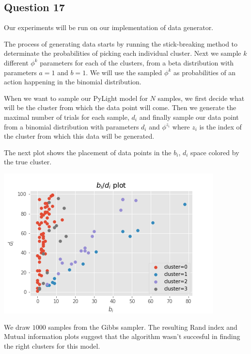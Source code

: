 \documentclass[]{article}
\begin{document}
	
	
	\subsection*{Question 17}
	
	Our experiments will be run on our implementation of data generator. 
	
	The process of generating data starts by running the stick-breaking method to determinate the probabilities of picking each individual cluster. Next we sample $k$ different $\phi^k$ parameters for each of the clusters, from a beta distribution with parameters $a=1$ and $b=1$.
	We will use the sampled $\phi^k$ as probabilities of an action happening in the binomial distribution.
	
	When we want to sample our PyLight model for $N$ samples, we first decide what will be the cluster from which the data point will come. Then we generate the maximal number of trials for each sample, $d_i$ and finally sample our data point from a binomial distribution with parameters $d_i$ and $\phi^{z_i}$ where $z_i$ is the index of the cluster from which this data will be generated.  
	
	The next plot shows the placement of data points in the $b_i$, $d_i$ space colored by the true cluster.
	
	\begin{center}
		
		\includegraphics[width=.6\textwidth]{task6/figures/T_3_1/Q2/data_plot.png}
				
	\end{center}
	
	We draw $1000$ samples from the Gibbs sampler. The resulting Rand index and Mutual information plots suggest that the algorithm wasn't succesful in finding the right clusters for this model.
	
\end{document}
